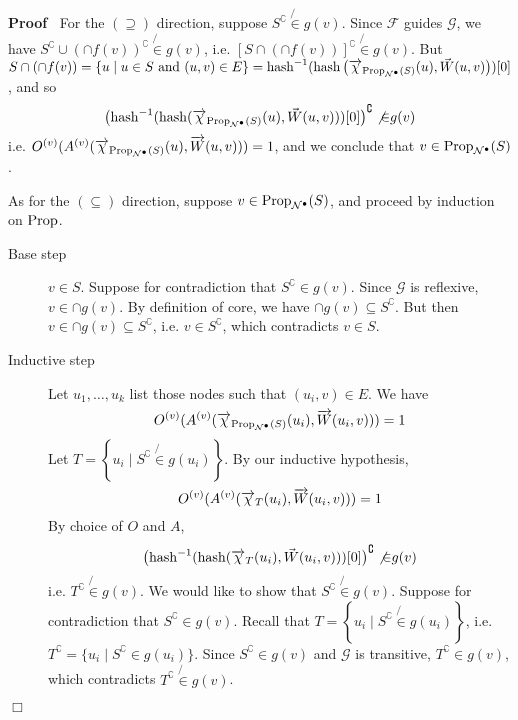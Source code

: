 \documentclass{article}
\newcommand{\infixand}{\text{ and }}
\newcommand{\tmop}[1]{\ensuremath{\operatorname{#1}}}
\newenvironment{proof}{\noindent\textbf{Proof\ }}{\hspace*{\fill}$\Box$\medskip}
\newcommand{\Net}{\ensuremath{\mathcal{N}}}
\newcommand{\bigchi}{\Large{\chi}}
\newcommand{\hash}{\textsf{\tmop{hash}}}
\newcommand{\Prop}{\textsf{\tmop{Prop}}}
\begin{document}
\begin{proof}
  For the $(\supseteq)$ direction, suppose $S^{\complement} \not{\in} g (v)$.
  Since $\mathcal{F}$ guides $\mathcal{G}$, we have $S^{\complement} \cup
  {(\cap f (v))^{\complement}}  \not{\in} g (v)$, i.e. $[S \cap (\cap f
  (v))]^{\complement} \not{\in} g (v)$. But $S \cap (\cap f (v)) = \left\{ u
  \mid u \in S \infixand (u , v) \in E \right\} = \hash^{- 1} (\hash \left(
  \smash{\overrightarrow{\bigchi}}_{\Prop_{\Net^{\bullet}} (S)} (u),
  \smash{\vec{W}} (u, v) \right)) [0]$, and so
  \[ \left( \hash^{- 1} (\hash
     (\smash{\overrightarrow{\bigchi}}_{\Prop_{\Net^{\bullet}} (S)} (u),
     \smash{\vec{W}} (u, v))) [0] \right)^{\complement} \not{\in} g (v) \]
  i.e. $O^{(v)} (A^{(v)}
  (\smash{\overrightarrow{\bigchi}}_{\Prop_{\Net^{\bullet}} (S)} (u),
  \smash{\overrightarrow{W}} (u, v))) = 1$, and we conclude that $v \in
  \Prop_{\Net^{\bullet}} (S)$.
  
  As for the $(\subseteq)$ direction, suppose $v \in \Prop_{\Net^{\bullet}}
  (S)$, and proceed by induction on $\Prop$.
  \begin{description}
    \item[Base step] $v \in S$. Suppose for contradiction that
    $S^{\complement} \in g (v)$. Since $\mathcal{G}$ is reflexive, $v \in \cap
    g (v)$. By definition of core, we have $\cap g (v) \subseteq
    S^{\complement}$. But then $v \in \cap g (v) \subseteq S^{\complement}$,
    i.e. $v \in S^{\complement}$, which contradicts $v \in S$.
    
    \item[Inductive step] Let $u_1, \ldots, u_k$ list those nodes such that
    $(u_i, v) \in E$. We have
    \[ O^{(v)} (A^{(v)}
       (\smash{\overrightarrow{\bigchi}}_{\Prop_{\Net^{\bullet}} (S)} (u_i),
       \smash{\overrightarrow{W}} (u_i, v))) = 1 \]
    Let $T = \left\{ u_i \mid S^{\complement}  \not{\in} g (u_i) \right\}$. By
    our inductive hypothesis,
    \[ O^{(v)} (A^{(v)} (\smash{\overrightarrow{\bigchi}}_T (u_i),
       \smash{\overrightarrow{W}} (u_i, v))) = 1 \]
    By choice of $O$ and $A$,
    \[ \left( \hash^{- 1} (\hash (\smash{\overrightarrow{\bigchi}}_T (u_i),
       \smash{\vec{W}} (u_i, v))) [0] \right)^{\complement} \not{\in} g (v) \]
    i.e. $T^{\complement} \not{\in} g (v)$. We would like to show that
    $S^{\complement} \not{\in} g (v)$. Suppose for contradiction that
    $S^{\complement} \in g (v)$. Recall that $T = \left\{ u_i \mid
    S^{\complement}  \not{\in} g (u_i) \right\}$, i.e. $T^{\complement} = \{
    u_i \mid S^{\complement} \in g (u_i) \}$. Since $S^{\complement} \in g
    (v)$ and $\mathcal{G}$ is transitive, $T^{\complement} \in g (v)$, which
    contradicts $T^{\complement} \not{\in} g (v)$.
  \end{description}
  
\end{proof}
\end{document}
